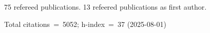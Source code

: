 75 refereed publications. 13 refeered publications as first author.

Total citations~=~5052; h-index~=~37 (2025-08-01)